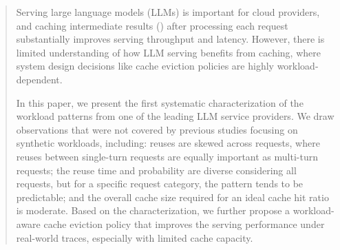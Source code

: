 \begin{abstract}
    \noindent
    Serving large language models (LLMs) is important for cloud providers,
    and caching intermediate results ({\kvcache}) after processing each request
    substantially improves serving throughput and latency.
    However, there is limited understanding of how LLM serving benefits
    from {\kvcache} caching,
    where system design decisions like cache eviction policies
    are highly workload-dependent.

    In this paper, we present the first systematic characterization of
    the {\kvcache} workload patterns from one of the leading LLM service providers.
    We draw observations that were not covered
    by previous studies focusing on synthetic workloads,
    including: {\kvcache} reuses are skewed across requests,
    where reuses between single-turn requests are equally important as multi-turn requests;
    the reuse time and probability are diverse considering all requests,
    but for a specific request category, the pattern tends to be predictable;
    and the overall cache size required for an ideal cache hit ratio is moderate.
    Based on the characterization,
    we further propose a workload-aware cache eviction policy
    that improves the serving performance under real-world traces,
    especially with limited cache capacity.
\end{abstract}